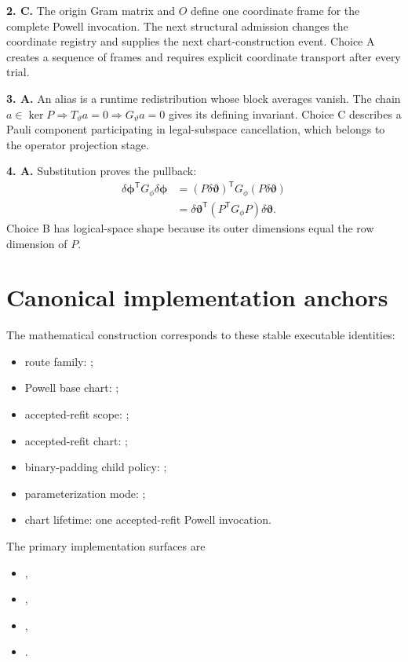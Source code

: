 \documentclass[10pt,twocolumn]{article}
\begin{document}
\textbf{2. C.} The origin Gram matrix and \(O\) define one coordinate frame for
the complete Powell invocation. The next structural admission changes the
coordinate registry and supplies the next chart-construction event. Choice A
creates a sequence of frames and requires explicit coordinate transport after
every trial.

\textbf{3. A.} An alias is a runtime redistribution whose block averages vanish.
The chain \(a\in\ker P\Rightarrow T_\vartheta a=0\Rightarrow
G_\vartheta a=0\) gives its defining invariant. Choice C describes a Pauli
component participating in legal-subspace cancellation, which belongs to the
operator projection stage.

\textbf{4. A.} Substitution proves the pullback:
\begin{align*}
\delta\bm\phi^{\mathsf T}G_\phi\delta\bm\phi
&=(P\delta\bm\vartheta)^{\mathsf T}G_\phi
(P\delta\bm\vartheta)\\
&=\delta\bm\vartheta^{\mathsf T}
(P^{\mathsf T}G_\phi P)\delta\bm\vartheta.
\end{align*}
Choice B has logical-space shape because its outer dimensions equal the row
dimension of \(P\).

\section*{Canonical implementation anchors}

The mathematical construction corresponds to these stable executable
identities:
\begin{itemize}[leftmargin=1.25em,itemsep=2pt,topsep=2pt]
\item route family: ;
\item Powell base chart:
;
\item accepted-refit scope: ;
\item accepted-refit chart:
;
\item binary-padding child policy:
;
\item parameterization mode: ;
\item chart lifetime: one accepted-refit Powell invocation.
\end{itemize}

The primary implementation surfaces are
\begin{itemize}[leftmargin=1.25em,itemsep=2pt,topsep=2pt]
\item {},
\item {},
\item {},
\item {}.
\end{itemize}
\end{document}
